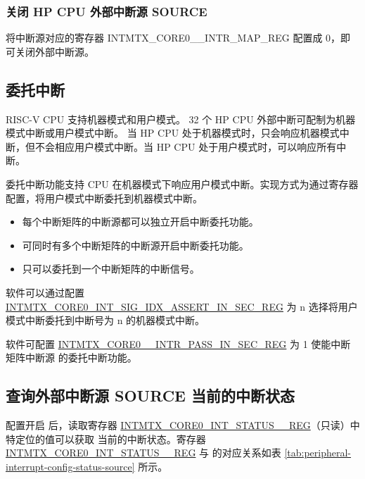 \documentclass[main\_\_CN.tex]{subfiles}
\begin{document}
\subsubsection{关闭 HP CPU 外部中断源 SOURCE}

将中断源对应的寄存器 INTMTX\_CORE0\_\_INTR\_MAP\_REG 配置成 0，即可关闭外部中断源。



\subsection{委托中断}
\chipname{} RISC-V CPU 支持机器模式和用户模式。 32 个 HP CPU 外部中断可配制为机器模式中断或用户模式中断。 当 HP CPU 处于机器模式时，只会响应机器模式中断，但不会相应用户模式中断。当 HP CPU 处于用户模式时，可以响应所有中断。


委托中断功能支持 CPU 在机器模式下响应用户模式中断。实现方式为通过寄存器配置，将用户模式中断委托到机器模式中断。

\begin{itemize}

    \item 每个中断矩阵的中断源都可以独立开启中断委托功能。
    \item 可同时有多个中断矩阵的中断源开启中断委托功能。
    \item 只可以委托到一个中断矩阵的中断信号。

\end{itemize}

软件可以通过配置 \hyperref[regdesc:INTMTXCORE0INTSIGIDXASSERTINSECREG]{INTMTX\_CORE0\_INT\_SIG\_IDX\_ASSERT\_IN\_SEC\_REG} 为 n 选择将用户模式中断委托到中断号为 n 的机器模式中断。

软件可配置 \hyperref[INTMTXCORE0SOURCEINTRMAPREG]{INTMTX\_CORE0\_\_INTR\_PASS\_IN\_SEC\_REG} 为 1 使能中断矩阵中断源  的委托中断功能。


\subsection{查询外部中断源 SOURCE 当前的中断状态}

配置开启  后，读取寄存器 \hyperref[regdesc:INTMTXCORE0INTSTATUS0REG] {INTMTX\_CORE0\_INT\_STATUS\_\_REG}（只读）中特定位的值可以获取  当前的中断状态。寄存器 \hyperref[regdesc:INTMTXCORE0INTSTATUS0REG]{INTMTX\_CORE0\_INT\_STATUS\_\_REG} 与  的对应关系如表 \ref{tab:peripheral-interrupt-config-status-source} 所示。
\end{document}
